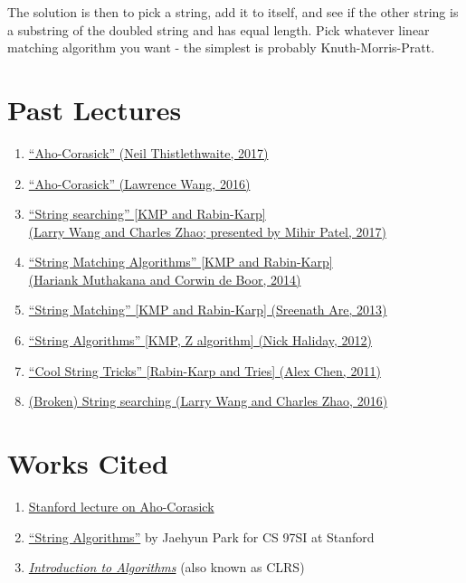 \documentclass[11pt, oneside]{article}
\begin{document}
\begin{enumerate}
  The solution is then to pick a string, add it to itself, and see if the other string is a substring of the doubled string
  and has equal length. Pick whatever linear matching algorithm you want - the simplest is probably Knuth-Morris-Pratt.

\end{enumerate}

\newpage

\section{Past Lectures}

\begin{enumerate}
  \item \href{https://activities.tjhsst.edu/sct/lectures/1617/2017-06-02_Aho_Corasick.pdf}{``Aho-Corasick'' (Neil Thistlethwaite, 2017)}
  \item \href{https://activities.tjhsst.edu/sct/lectures/1516/SCT_Aho_Corasick.pdf}{``Aho-Corasick'' (Lawrence Wang, 2016)}
  \item \href{https://activities.tjhsst.edu/sct/lectures/1718/2017-10-27_String_Searching.pdf}{``String searching'' [KMP and Rabin-Karp] \\ (Larry Wang and Charles Zhao; presented by Mihir Patel, 2017)}
  \item \href{https://activities.tjhsst.edu/sct/lectures/1415/stringmatching_10_3_14.pdf}{``String Matching Algorithms'' [KMP and Rabin-Karp] \\ (Hariank Muthakana and Corwin de Boor, 2014)}
  \item \href{https://activities.tjhsst.edu/sct/lectures/1314/string_matching_11_01_13.pdf}{``String Matching'' [KMP and Rabin-Karp] (Sreenath Are, 2013)}
  \item \href{https://activities.tjhsst.edu/sct/lectures/1112/string.pdf}{``String Algorithms'' [KMP, Z algorithm] (Nick Haliday, 2012)}
  \item \href{https://activities.tjhsst.edu/sct/lectures/1112/strings111811.pdf}{``Cool String Tricks'' [Rabin-Karp and Tries] (Alex Chen, 2011)}
  \item \href{https://activities.tjhsst.edu/sct/lectures/1617/2016-11-11_String_Searching.pdf}{(Broken) String searching (Larry Wang and Charles Zhao, 2016)}
\end{enumerate}

\section{Works Cited}

\begin{enumerate}
  \item \href{http://web.stanford.edu/class/archive/cs/cs166/cs166.1166/lectures/02/Small02.pdf}{Stanford lecture on Aho-Corasick}
  \item \href{https://web.stanford.edu/class/cs97si/10-string-algorithms.pdf}{``String Algorithms''} by Jaehyun Park for CS 97SI at Stanford
  \item \href{https://mitpress.mit.edu/books/introduction-algorithms-third-edition}{\textit{Introduction to Algorithms}} (also known as CLRS)
\end{enumerate}
\end{document}
